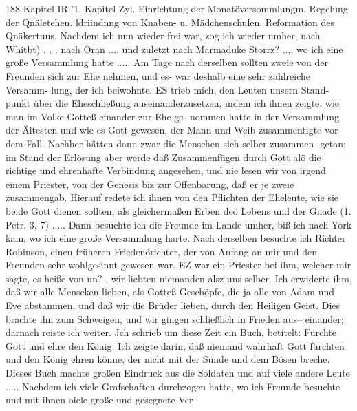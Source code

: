 188 Kapitel IR-’1.
Kapitel Zyl.
Einrichtung der Monatöversommlungm. Regelung
der Qnäletehen. ldriindnng von Knaben- u. Mädchenschulen.
Reformation des Qnäkertuus.
Nachdem ich nun wieder frei war, zog ich wieder umher,
nach Whitbt) . . . nach Oran .... und zuletzt nach Marmaduke
Storrz? ..,. wo ich eine große Versammlung hatte ..... Am
Tage nach derselben sollten zweie von der Freunden sich zur
Ehe nehmen, und es- war deshalb eine sehr zahlreiche Versamm-
lung, der ich beiwohnte. ES trieb mich, den Leuten unsern Stand-
punkt über die Eheschließung auseinanderzusetzen, indem ich
ihnen zeigte, wie man im Volke Gotteß einander zur Ehe ge-
nommen hatte in der Versammlung der Ältesten und wie es Gott
gewesen, der Mann und Weib zusammentigte vor dem Fall.
Nachher hätten dann zwar die Menschen sich selber zusammen-
getan; im Stand der Erlösung aber werde daß Zusammenfügen
durch Gott alö die richtige und ehrenhafte Verbindung angesehen,
und nie lesen wir von irgend einem Priester, von der Genesis
biz zur Offenbarung, daß er je zweie zusammengab. Hierauf
redete ich ihnen von den Pflichten der Eheleute, wie sie beide Gott
dienen sollten, als gleichermaßen Erben deö Lebens und der Gnade
(1. Petr. 3, 7) ..... Dann besuchte ich die Freunde im Lande
umher, biß ich nach York kam, wo ich eine große Versammlung
harte. Nach derselben besuchte ich Richter Robinson, einen früheren
Friedenörichter, der von Anfang an mir und den Freunden sehr
wohlgesinnt gewesen war. EZ war ein Priester bei ihm, welcher
mir sagte, es heiße von un?-, wir liebten niemanden alsz uns selber.
Ich erwiderte ihm, daß wir alle Menscken lieben, als Gotteß
Geschöpfe, die ja alle von Adam und Eve abstammen, und daß
wir die Brüder lieben, durch den Heiligen Geist. Dies brachte
ihn zum Schweigen, und wir gingen schließlich in Frieden aus--
einander; darnach reiste ich weiter.
Jch schrieb um diese Zeit ein Buch, betitelt: Fürchte Gott
und ehre den König. Ich zeigte darin, daß niemand wahrhaft
Gott fürchten und den König ehren könne, der nicht mit der Sünde
und dem Bösen breche. Dieses Buch machte großen Eindruck
aus die Soldaten und auf viele andere Leute .....
Nachdem ich viele Grafschaften durchzogen hatte, wo ich
Freunde besuchte und mit ihnen oiele große und gesegnete Ver-


